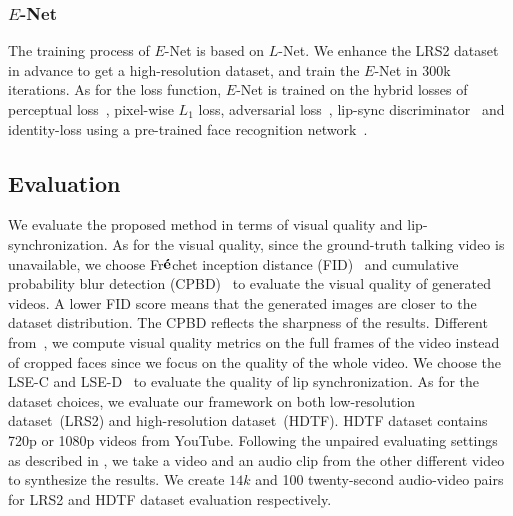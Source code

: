 \subsubsection{$E$-Net}
The training process of $E$-Net is based on $L$-Net. We enhance the LRS2 dataset in advance to get a high-resolution dataset, and train the $E$-Net in 300k iterations. 
As for the loss function, $E$-Net is trained on the hybrid losses of perceptual loss~\cite{johnson2016perceptual_loss}, pixel-wise $L_1$ loss, adversarial loss~\cite{pix2pix}, lip-sync discriminator~\cite{wav2lip} and identity-loss using a pre-trained face recognition network~\cite{deng2019arcface}.






\subsection{Evaluation}

We evaluate the proposed method in terms of visual quality and lip-synchronization. As for the visual quality, since the ground-truth talking video is unavailable, we choose Fr$\rm\bf\acute{e}$chet inception distance (FID)~\cite{heusel2017fid} and cumulative probability blur detection (CPBD)~\cite{narvekar2009no} to evaluate the visual quality of generated videos. A lower FID score means that the generated images are closer to the dataset distribution. The CPBD reflects the sharpness of the results. Different from~\cite{wav2lip}, we compute visual quality metrics on the full frames of the video instead of cropped faces since we focus on the quality of the whole video. 
We choose the LSE-C and LSE-D~\cite{wav2lip} to evaluate the quality of lip synchronization. As for the dataset choices, we evaluate our framework on both low-resolution dataset~(LRS2) and high-resolution dataset~(HDTF). 
HDTF dataset contains 720p or 1080p videos from YouTube.
Following the unpaired evaluating settings as described in \cite{wav2lip}, we take a video and an audio clip from the other different video to synthesize the results. We create $14k$ and 100 twenty-second audio-video pairs for LRS2 and HDTF dataset evaluation respectively.


